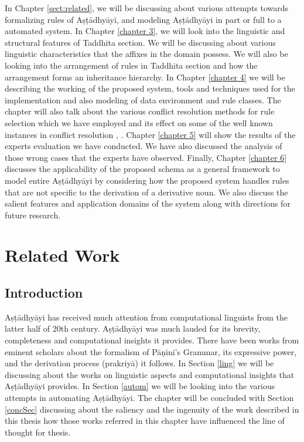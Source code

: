 \documentclass[a4paper,11pt,twoside,openright]{report}
\begin{document}
In Chapter \ref{sect:related}, we will be discussing about various attempts towards formalizing rules of Aṣṭādhyāyi, and modeling Aṣṭādhyāyi in part or full to a automated system. In Chapter \ref{chapter 3}, we will look into the linguistic and structural features of Taddhita section. We will be discussing about various linguistic characteristics that the affixes in the domain possess. We will also be looking into the arrangement of rules in Taddhita section and how the arrangement forms an inheritance hierarchy. In Chapter \ref{chapter 4} we will be describing the working of the proposed system, tools and techniques used for the implementation and also modeling of data environment and rule classes. The chapter will also talk about the various conflict resolution methods  for rule selection which we have employed and its effect on some of the well known instances in conflict resolution \cite{cardona65}, \cite{scharf10a}.
Chapter \ref{chapter 5} will show the results of the experts evaluation we have conducted. We have also discussed the analysis of those wrong cases that the experts have observed. Finally, Chapter \ref{chapter 6} discusses the applicability of the proposed schema as a general framework to model entire Aṣṭādhyāyi by considering how the proposed system handles rules that are not specific to the derivation of a derivative noun. We also discuss the salient features and application domains of the system along with directions for future research.

\chapter{Related Work}
\label{sect:related}

\section{Introduction}
Aṣṭādhyāyi has received much attention from computational linguists from the latter half of
20th century. Aṣṭādhyāyi was much lauded for its brevity, completeness and computational
insights it provides. There have been works from eminent scholars about the formalism of Pāṇini’s Grammar, its expressive power, and the derivation process (prakriyā) it follows. In Section \ref{ling} we will be discussing about the works on linguistic aspects and computational insights that Aṣṭādhyāyi provides. In Section \ref{autom} we will be looking into the various attempts in automating Aṣṭādhyāyi. The chapter will be concluded with Section \ref{concSec} discussing about the saliency and the ingenuity of the work described in this thesis how those works referred in this chapter have influenced the line of thought for thesis.
\end{document}
